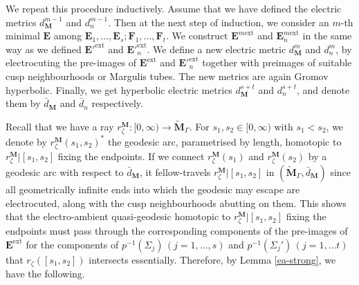 \documentclass{amsart}
\theoremstyle{definition}
\newcommand{\hyperbolic}{\mathbb{H}}
\begin{document}
We repeat this  procedure inductively.
Assume that we have defined the electric metrics $d^{m-1}_\mathbf{M}$ and $d^{m-1}_n$.
 Then at the next step of induction, we consider an $m$-th minimal  $\mathbf E$ among $\mathbf E_1, \dots , \mathbf E_s; \mathbf F_1, \dots, \mathbf F_t$. We construct $\mathbf E^{m\mathrm{ext}}$ and $\mathbf E^{m\mathrm{ext}}_n$ in the same way as we defined $\mathbf {E'}^{\mathrm{ext}}$ and ${\mathbf E'}^\mathrm{ext}_n$. 
 We define a new electric metric $d^m_\mathbf{M}$ and $d^m_n$, by electrocuting  the pre-images of $\mathbf E^{\mathrm{ext}}$ and ${\mathbf E'}^\mathrm{ext}_n$ together with preimages of suitable cusp neighbourhoods or Margulis tubes. The new metrics  are again Gromov hyperbolic.
Finally, we get  hyperbolic electric metrics $d^{s+t}_\mathbf{M}$ and $d^{s+t}_n$,  and denote them by $\bar d_\mathbf{M}$ and $\bar d_n$ respectively.



Recall that we have a  ray $r_\zeta^{\mathbf M}: [0,\infty) \rightarrow \widetilde{\mathbf M}_\Gamma$.
For $s_1, s_2 \in [0,\infty)$ with $s_1< s_2$, we denote by $r_\zeta^{\mathbf M}(s_1, s_2)^*$ the geodesic arc, parametrised by length, homotopic to $r_\zeta^{\mathbf M}|[s_1, s_2]$ fixing the endpoints.
If we connect $r^\mathbf{M}_\zeta(s_1)$ and $r^\mathbf{M}_\zeta(s_2)$ by a geodesic arc with respect to $\bar d_{\mathbf M}$, it fellow-travels $r^\mathbf{M}_\zeta|[s_1, s_2]$ in $(\widetilde{\mathbf M}_\Gamma, \bar d_\mathbf{M})$ since all geometrically infinite ends  into which the geodesic may escape are electrocuted, along with the cusp neighbourhoods abutting on them.
This shows that the electro-ambient quasi-geodesic homotopic to $r_\zeta^{\mathbf M}|[s_1, s_2]$ fixing the endpoints must pass through the corresponding components of the pre-images of $\mathbf E^{\mathrm{ext}}$ for the components of $p^{-1}(\Sigma_j)\, (j=1, \dots , s)$ and  $p^{-1}(\Sigma_j')\, (j=1, \dots t)$  that  $r_\zeta([s_1,s_2])$ intersects essentially.
Therefore, by Lemma \ref{ea-strong}, we have the following.
\end{document}
